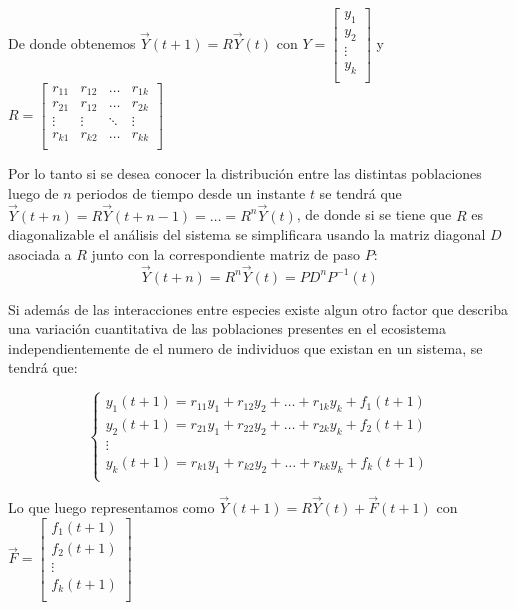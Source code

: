 De donde obtenemos $\vec{Y}(t+1) = R\vec{Y}(t)$ con 
$Y = \left[\begin{array}{c}
    y_1\\
    y_2\\
    \vdots\\
    y_k\\
\end{array}\right]$ y
$R = \left[\begin{array}{cccc}
    r_{11} & r_{12} & \dots & r_{1k} \\
    r_{21} & r_{12} & \dots & r_{2k} \\
    \vdots & \vdots & \ddots & \vdots \\
    r_{k1} & r_{k2} & \dots & r_{kk} \\
\end{array}\right]$

Por lo tanto si se desea conocer la distribución entre las distintas poblaciones luego de $n$ periodos de tiempo desde un instante $t$ se tendrá que $\vec{Y}(t+n) = R\vec{Y}(t+n-1) = \dots = R^{n}\vec{Y}(t)$, de donde si se tiene que $R$ es diagonalizable el análisis del sistema se simplificara usando la matriz diagonal $D$ asociada a $R$ junto con la correspondiente matriz de paso $P$:
\[
    \vec{Y}(t+n) = R^{n}\vec{Y}(t) = PD^{n}P^{-1}(t)
\]

Si además de las interacciones entre especies existe algun otro factor que describa una variación cuantitativa de las poblaciones presentes en el ecosistema independientemente de el numero de individuos que existan en un sistema, se tendrá que:

\[
	\begin{cases}
	 y_{1}(t+1) = r_{11}y_{1} + r_{12}y_{2} + \dots + r_{1k}y_{k} + f_1(t+1)\\
	 y_{2}(t+1) = r_{21}y_{1} + r_{22}y_{2} + \dots + r_{2k}y_{k} + f_2(t+1)\\
	 \vdots\\
	 y_{k}(t+1) = r_{k1}y_{1} + r_{k2}y_{2} + \dots + r_{kk}y_{k} + f_k(t+1)\\
	\end{cases}
\]

Lo que luego representamos como $\vec{Y}(t+1) = R\vec{Y}(t) + \vec{F}(t+1)$ con  
$\vec{F} = \left[\begin{array}{c}
    f_1(t+1)\\
    f_2(t+1)\\
    \vdots\\
    f_k(t+1)\\
\end{array}\right]$